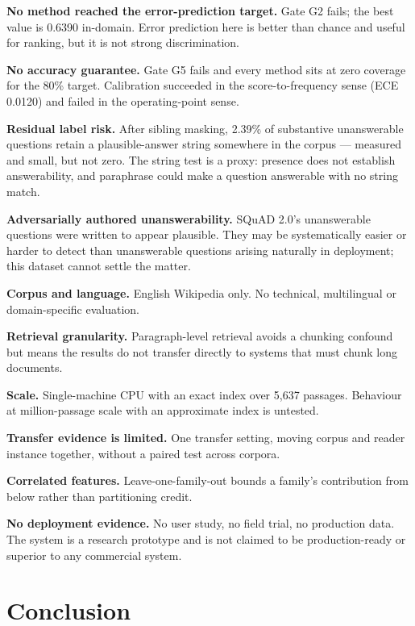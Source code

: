 \documentclass[conference]{IEEEtran}
\begin{document}
\textbf{No method reached the error-prediction target.} Gate G2 fails; the best value is 0.6390 in-domain. Error prediction here is better than chance and useful for ranking, but it is not strong discrimination.

\textbf{No accuracy guarantee.} Gate G5 fails and every method sits at zero coverage for the 80\% target. Calibration succeeded in the score-to-frequency sense (ECE 0.0120) and failed in the operating-point sense.

\textbf{Residual label risk.} After sibling masking, 2.39\% of substantive unanswerable questions retain a plausible-answer string somewhere in the corpus --- measured and small, but not zero. The string test is a proxy: presence does not establish answerability, and paraphrase could make a question answerable with no string match.

\textbf{Adversarially authored unanswerability.} SQuAD 2.0's unanswerable questions were written to appear plausible. They may be systematically easier or harder to detect than unanswerable questions arising naturally in deployment; this dataset cannot settle the matter.

\textbf{Corpus and language.} English Wikipedia only. No technical, multilingual or domain-specific evaluation.

\textbf{Retrieval granularity.} Paragraph-level retrieval avoids a chunking confound but means the results do not transfer directly to systems that must chunk long documents.

\textbf{Scale.} Single-machine CPU with an exact index over 5,637 passages. Behaviour at million-passage scale with an approximate index is untested.

\textbf{Transfer evidence is limited.} One transfer setting, moving corpus and reader instance together, without a paired test across corpora.

\textbf{Correlated features.} Leave-one-family-out bounds a family's contribution from below rather than partitioning credit.

\textbf{No deployment evidence.} No user study, no field trial, no production data. The system is a research prototype and is not claimed to be production-ready or superior to any commercial system.

\section{Conclusion}
\end{document}
